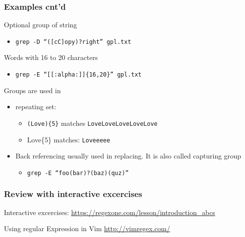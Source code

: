 \documentclass[newPxFont,sthlmFooter,nooffset]{beamer}
\begin{document}
\begin{frame}[t]
  \frametitle{Examples cnt'd}
Optional group of string
\begin{itemize}
\item \texttt{grep -D ``([cC]opy)?right'' gpl.txt}
\end{itemize}

\bigskip

Words with 16 to 20 characters
\begin{itemize}
\item \texttt{grep -E ``[[:alpha:]]\{16,20\}'' gpl.txt}
\end{itemize}

\bigskip

Groups are used in
\begin{itemize}
\item repeating set: 
  \begin{itemize}
  \item \texttt{(Love)\{5\}} matches \texttt{LoveLoveLoveLoveLove}
  \item Love\{5\} matches: \texttt{Loveeeee}
  \end{itemize}
\item Back referencing usually used in replacing. It is also called capturing group
  \begin{itemize}
  \item \texttt{grep -E ``foo(bar)?(baz)(quz)'' }
  \end{itemize}
\end{itemize}
\end{frame}

\begin{frame}
  \frametitle{Review with interactive excercises}

Interactive excercises: 
  \url{https://regexone.com/lesson/introduction_abcs}

Using regular Expression in Vim
  \url{http://vimregex.com/}

\end{frame}

\end{document}
